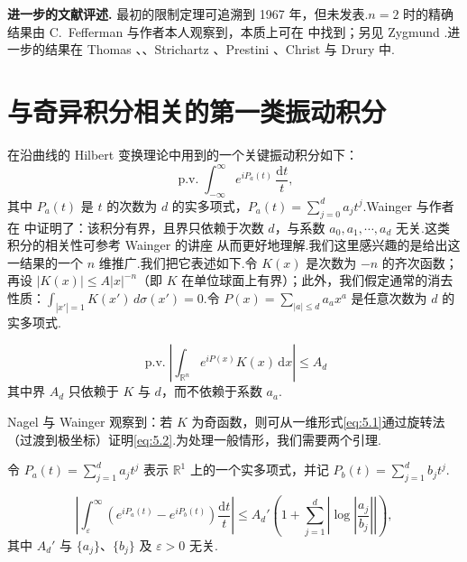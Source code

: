 \documentclass[
  BookTitleCN={傅里叶分析中的振动积分},
  BookTitleEN={Oscillatory Integrals in Fourier Analysis},
  OriginalAuthor={E.~M. Stein},
  OriginalEdition={Proc. Sympos. Pure Math. 35, Part~1},
  OriginalPublisher={American Mathematical Society},
  OriginalYear={1979},
  Translator={翻译及重排},
  ModelUsed={Codex CLI},
  Biblatex=false,
  TranslationDate={2026年8月27日}
]{mathtranslation}
\numberwithin{equation}{chapter}   %
\newcommand{\R}{\mathbb{R}}
\begin{document}
\noindent\textbf{进一步的文献评述.} 最初的限制定理可追溯到 1967 年，但未发表.$n=2$ 时的精确结果由 C.~Fefferman 与作者本人观察到，本质上可在 \cite{ref9} 中找到；另见 Zygmund \cite{ref33}.进一步的结果在 Thomas \cite{ref30}、\cite{ref31}、Strichartz \cite{ref29}、Prestini \cite{ref24}、Christ \cite{ref4} 与 Drury \cite{ref7} 中.
\chapter{与奇异积分相关的第一类振动积分}

\noindent 在沿曲线的 Hilbert 变换理论中用到的一个关键振动积分如下：
\begin{equation}
  \operatorname{p.v.}\int_{-\infty}^{\infty}e^{iP_{a}(t)}\,\frac{\mathrm{d}t}{t}, \label{eq:5.1}
\end{equation}
其中 $P_{a}(t)$ 是 $t$ 的次数为 $d$ 的实多项式，$P_{a}(t)=\sum_{j=0}^{d}a_{j}t^{j}$.Wainger 与作者在 \cite{ref27} 中证明了：该积分有界，且界只依赖于次数 $d$，与系数 $a_{0},a_{1},\cdots,a_{d}$ 无关.这类积分的相关性可参考 Wainger 的讲座 \cite{ref32} 从而更好地理解.我们这里感兴趣的是给出这一结果的一个 $n$ 维推广.我们把它表述如下.令 $K(x)$ 是次数为 $-n$ 的齐次函数；再设 $|K(x)|\leq A|x|^{-n}$（即 $K$ 在单位球面上有界）；此外，我们假定通常的消去性质：$\int_{|x'|=1}K(x')\,d\sigma(x')=0$.令 $P(x)=\sum_{|a|\leq d}a_{a}x^{a}$ 是任意次数为 $d$ 的实多项式.

\begin{theorem}\label{thm:5}
  \begin{equation}
    \operatorname{p.v.}\left|\int_{\R^{n}}e^{iP(x)}K(x)\,\mathrm{d}x\right|\leq A_{d} \label{eq:5.2}
  \end{equation}
  其中界 $A_{d}$ 只依赖于 $K$ 与 $d$，而不依赖于系数 $a_{a}$.
\end{theorem}

\noindent Nagel 与 Wainger 观察到：若 $K$ 为奇函数，则可从一维形式\eqref{eq:5.1}通过旋转法（过渡到极坐标）证明\eqref{eq:5.2}.为处理一般情形，我们需要两个引理.

\noindent 令 $P_{a}(t)=\sum_{j=1}^{d}a_{j}t^{j}$ 表示 $\R^{1}$ 上的一个实多项式，并记 $P_{b}(t)=\sum_{j=1}^{d}b_{j}t^{j}$.

\begin{lemma}\label{lem:1}
  \begin{equation}
    \left|\int_{\varepsilon}^{\infty}\left(e^{iP_{a}(t)}-e^{iP_{b}(t)}\right)\frac{\mathrm{d}t}{t}\right|\leq A_{d}'\left(1+\sum_{j=1}^{d}\left|\log\left|\frac{a_{j}}{b_{j}}\right|\right|\right), \label{eq:5.3}
  \end{equation}
  其中 $A_{d}'$ 与 $\{a_{j}\}$、$\{b_{j}\}$ 及 $\varepsilon>0$ 无关.
\end{lemma}
\end{document}
